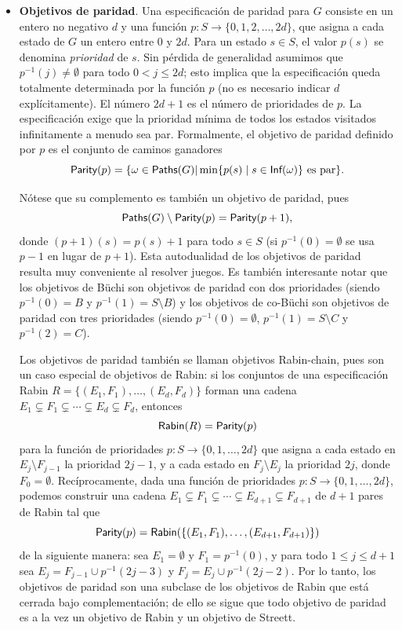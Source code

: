 \begin{itemize}
	\item \textbf{Objetivos de paridad}. Una especificación de paridad para \(G\) consiste en un entero no negativo \(d\) y una función \(p\colon S\to\{0,1,2,\dots,2d\}\), que asigna a cada estado de \(G\) un entero entre \(0\) y \(2d\). Para un estado \(s\in S\), el valor \(p(s)\) se denomina \emph{prioridad} de \(s\). Sin pérdida de generalidad asumimos que \(p^{-1}(j)\neq\emptyset\) para todo \(0<j\le2d\); esto implica que la especificación queda totalmente determinada por la función \(p\) (no es necesario indicar \(d\) explícitamente). El número \(2d+1\) es el número de prioridades de \(p\). La especificación exige que la prioridad mínima de todos los estados visitados infinitamente a menudo sea par. Formalmente, el objetivo de paridad definido por \(p\) es el conjunto de caminos ganadores $$ \textsf{Parity}(p)=\{\omega\in \textsf{Paths}(G) | \min\{p(s)\mid s\in \textsf{Inf}(\omega)\}\text{ es par}\}.$$

	      Nótese que su complemento es también un objetivo de paridad, pues
	      $$\textsf{Paths}(G)\setminus \textsf{Parity}(p)= \textsf{Parity}(p+1),$$ donde \((p+1)(s)=p(s)+1\) para
	      todo \(s\in S\) (si \(p^{-1}(0)=\emptyset\) se usa \(p-1\) en lugar de
	      \(p+1\)). Esta autodualidad de los objetivos de paridad resulta muy conveniente
	      al resolver juegos. Es también interesante notar que los objetivos de Büchi son
	      objetivos de paridad con dos prioridades (siendo \(p^{-1}(0)=B\) y
	      \(p^{-1}(1)=S\setminus B\)) y los objetivos de co-Büchi son objetivos de
	      paridad con tres prioridades (siendo \(p^{-1}(0)=\emptyset\),
	      \(p^{-1}(1)=S\setminus C\) y \(p^{-1}(2)=C\)).

	      Los objetivos de paridad también se llaman objetivos Rabin-chain, pues son un
	      caso especial de objetivos de Rabin: si los conjuntos de una especificación
	      Rabin $R = \{(E_1,F_1),\dots,(E_d,F_d)\}$ forman una cadena \(E_1\subsetneq
	      F_1\subsetneq\cdots\subsetneq E_d\subsetneq F_d\), entonces $$\textsf{Rabin}(R) =
		      \textsf{Parity}(p)$$ para la función de prioridades $p : S \to \{0,1,\dots,2d\}$ que
	      asigna a cada estado en \(E_j\setminus F_{j-1}\) la prioridad \(2j-1\), y a
	      cada estado en \(F_j\setminus E_j\) la prioridad \(2j\), donde
	      \(F_0=\emptyset\). Recíprocamente, dada una función de prioridades $ p : S \to
		      \{0,1,\dots,2d\}$, podemos construir una cadena \(E_1\subsetneq
	      F_1\subsetneq\cdots\subsetneq E_{d+1}\subsetneq F_{d+1}\) de \(d+1\) pares de
	      Rabin tal que $$ \textsf{Parity}(p) = \textsf{Rabin}(\{(E_1,F_1),\dots,(E_{d+1},F_{d+1})\})$$
	      de la siguiente manera: sea \(E_1=\emptyset\) y \(F_1=p^{-1}(0)\), y para todo
	      \(1\le j\le d+1\) sea \(E_j=F_{j-1}\cup p^{-1}(2j-3)\) y \(F_j=E_j\cup
	      p^{-1}(2j-2)\). Por lo tanto, los objetivos de paridad son una subclase de los
	      objetivos de Rabin que está cerrada bajo complementación; de ello se sigue que
	      todo objetivo de paridad es a la vez un objetivo de Rabin y un objetivo de
	      Streett. %


\end{itemize}
